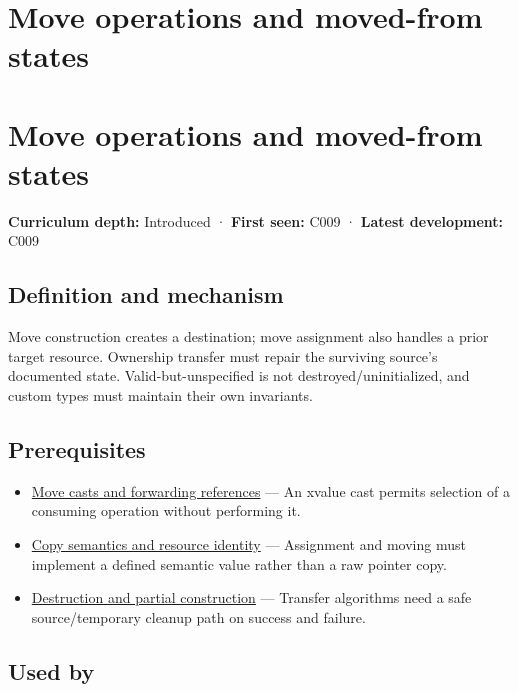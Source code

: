 \hypertarget{appendix-5636651017c2}{}
\section*{Move operations and moved-from states}
\section{Move operations and moved-from states}\label{appendix-5636651017c2-move-operations-and-moved-from-states}

\textbf{Curriculum depth:} Introduced · \textbf{First seen:} C009 · \textbf{Latest development:} C009

\subsection{Definition and mechanism}\label{appendix-5636651017c2-definition-and-mechanism}

Move construction creates a destination; move assignment also handles a prior target resource. Ownership transfer must repair the surviving source's documented state. Valid-but-unspecified is not destroyed/uninitialized, and custom types must maintain their own invariants.

\subsection{Prerequisites}\label{appendix-5636651017c2-prerequisites}

\begin{itemize}
\tightlist
\item
  \hyperref[appendix-0104b704fb11]{Move casts and forwarding references} --- An xvalue cast permits selection of a consuming operation without performing it.
\item
  \hyperref[appendix-1340cd1ce582]{Copy semantics and resource identity} --- Assignment and moving must implement a defined semantic value rather than a raw pointer copy.
\item
  \hyperref[appendix-9bfe377cef7a]{Destruction and partial construction} --- Transfer algorithms need a safe source/temporary cleanup path on success and failure.
\end{itemize}

\subsection{Used by}\label{appendix-5636651017c2-used-by}

